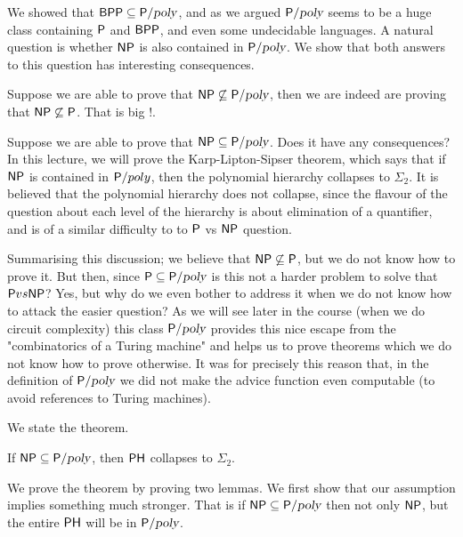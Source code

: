 \documentclass[11pt]{article}
\begin{document}

We showed that $\BPP \subseteq \P/\poly$, and as we argued $\P/\poly$ seems to be a huge class containing $\P$ and $\BPP$, and even some undecidable languages. A natural question is whether $\NP$ is also contained in $\P/\poly$. We show that both answers to this question has interesting consequences.

Suppose we are able to prove that $\NP \not\subseteq \P/\poly$, then we are indeed are proving that $\NP \not\subseteq \P$. That is big !.

Suppose we are able to prove that $\NP \subseteq \P/\poly$. Does it have any consequences?
In this lecture, we will prove the Karp-Lipton-Sipser theorem, which says that if $\NP$ is
contained in $\P/poly$, then the polynomial hierarchy collapses to $\Sigma_{2}$. It is believed
that the polynomial hierarchy does not collapse, since the flavour of the question about each level of the hierarchy is about elimination of a quantifier, and is of a similar difficulty to to $\P$ vs $\NP$ question. 

Summarising this discussion; we believe that $\NP \not\subseteq \P$, but we do not know how to prove it. But then, since $\P \subseteq \P/\poly$ is this not a harder problem to solve that $\P vs \NP$? Yes, but why do we even bother to address it when we do not know how to attack the easier question? As we will see later in the course (when we do circuit complexity) this class $\P/\poly$ provides this nice escape from the "combinatorics of a Turing machine" and helps us to prove theorems which we do not know how to prove otherwise. It was for precisely this reason that, in the definition of $\P/\poly$ we did not make the advice function even computable (to avoid references to Turing machines).

We state the theorem.
\begin{theorem}
If $\NP \subseteq \P/\poly$, then $\PH$ collapses to $\Sigma_2$.
\end{theorem}

We prove the theorem by proving two lemmas. We first show that our assumption implies something much stronger. That is if $\NP \subseteq \P/\poly$ then not only $\NP$, but the entire $\PH$ will be in $\P/\poly$.
\end{document}
